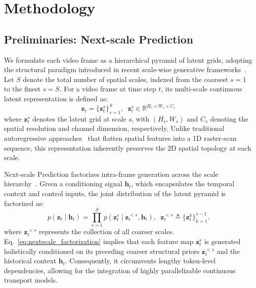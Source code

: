 \section{Methodology}
\label{Sec3:Method}

\subsection{Preliminaries: Next-scale Prediction}
\label{subsec:preliminaries}
We formulate each video frame as a hierarchical pyramid of latent grids, adopting the structural paradigm introduced in recent scale-wise generative frameworks~\cite{tian2024visual, wang2025sampo}. Let $S$ denote the total number of spatial scales, indexed from the coarsest $s=1$ to the finest $s=S$. For a video frame at time step $t$, its multi-scale continuous latent representation is defined as:
\begin{equation}
\label{eq:pyramid_latent}
\boldsymbol{z}_t = \{\boldsymbol{z}_t^{s}\}_{s=1}^{S}, \;\; \boldsymbol{z}_t^{s} \in \mathbb{R}^{H_s \times W_s \times C_s}
\end{equation}
where $\boldsymbol{z}_t^{s}$ denotes the latent grid at scale $s$, with $(H_s, W_s)$ and $C_s$ denoting the spatial resolution and channel dimension, respectively. Unlike traditional autoregressive approaches~\cite{parkerholder2024genie2,wu2024ivideogpt,wu2024controlmllm} that flatten spatial features into a 1D raster-scan sequence, this representation inherently preserves the 2D spatial topology at each scale.

Next-scale Prediction factorizes intra-frame generation across the scale hierarchy~\cite{tian2024visual}. Given a conditioning signal $\boldsymbol{h}_t$, which encapsulates the temporal context and control inputs, the joint distribution of the latent pyramid is factorized as:
\begin{equation}
\label{eq:nextscale_factorization}
p(\boldsymbol{z}_t \mid \boldsymbol{h}_t) = \prod_{s=1}^{S} p(\boldsymbol{z}_t^{s} \mid \boldsymbol{z}_t^{<s}, \boldsymbol{h}_t), \;\; \boldsymbol{z}_t^{<s} \triangleq \{\boldsymbol{z}_t^{k}\}_{k=1}^{s-1}.
\end{equation}
where $\boldsymbol{z}_t^{<s}$ represents the collection of all coarser scales. Eq.~\eqref{eq:nextscale_factorization} implies that each feature map $\boldsymbol{z}_t^{s}$ is generated holistically conditioned on its preceding coarser structural priors $\boldsymbol{z}_t^{<s}$ and the historical context $\boldsymbol{h}_t$.
Consequently, it circumvents lengthy token-level dependencies, allowing for the integration of highly parallelizable continuous transport models.

